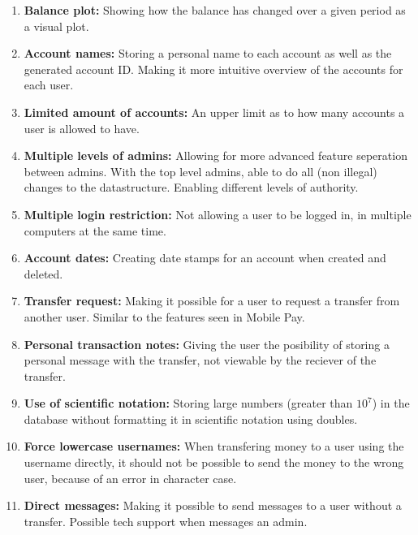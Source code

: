 \begin{enumerate}
    \item \textbf{Balance plot:} Showing how the balance has changed over a given period as a visual plot. 
    \item \textbf{Account names:} Storing a personal name to each account as well as the generated account ID. Making it more intuitive overview of the accounts for each user.
    \item \textbf{Limited amount of accounts:} An upper limit as to how many accounts a user is allowed to have.
    \item \textbf{Multiple levels of admins:} Allowing for more advanced feature seperation between admins. With the top level admins, able to do all (non illegal) changes to the datastructure. Enabling different levels of authority.
    \item \textbf{Multiple login restriction:} Not allowing a user to be logged in, in multiple computers at the same time. 
    \item \textbf{Account dates:} Creating date stamps for an account when created and deleted.
    \item \textbf{Transfer request:} Making it possible for a user to request a transfer from another user. Similar to the features seen in Mobile Pay.
    \item \textbf{Personal transaction notes:} Giving the user the posibility of storing a personal message with the transfer, not viewable by the reciever of the transfer.
    \item \textbf{Use of scientific notation:} Storing large numbers (greater than $10^7$) in the database without formatting it in scientific notation using doubles.
    \item \textbf{Force lowercase usernames:} When transfering money to a user using the username directly, it should not be possible to send the money to the wrong user, because of an error in character case. 
    \item \textbf{Direct messages:} Making it possible to send messages to a user without a transfer. Possible tech support when messages an admin.
\end{enumerate}





